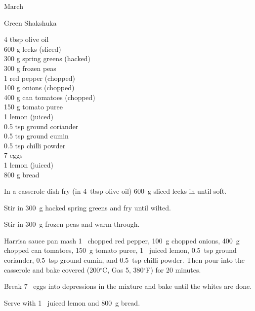 \begin{menu}{March}
    \begin{recipe}{2}{Green Shakshuka}%
		\begin{ingredients}
		4 tbsp olive oil  \\
	600 g leeks (sliced) \\
	300 g spring greens (hacked) \\
	300 g frozen peas  \\
	1  red pepper (chopped) \\
	100 g onions (chopped) \\
	400 g can tomatoes (chopped) \\
	150 g tomato puree  \\
	1  lemon (juiced) \\
	0.5 tsp ground coriander  \\
	0.5 tsp ground cumin  \\
	0.5 tsp chilli powder  \\
	7  eggs  \\
	1  lemon (juiced) \\
	800 g bread  \\
	
		\end{ingredients}
	
    \begin{instructions}
    \item 
        In a casserole dish fry
        (in 4~tbsp  olive oil)
        600~g sliced leeks
        in until soft.
      \item 
        Stir in 300~g hacked spring greens
        and fry until wilted.
      \item 
        Stir in 300~g  frozen peas
        and warm through.
      \item 
        Harrisa
        sauce pan
        mash
        1~ chopped red pepper,
        100~g chopped onions,
        400~g chopped can tomatoes,
        150~g  tomato puree,
        1~ juiced lemon,
        0.5~tsp  ground coriander,
        0.5~tsp  ground cumin,
        and 
        0.5~tsp  chilli powder.
        Then pour into the casserole
        and bake covered (200$^{\circ}$C, Gas 5, 380$^{\circ}$F) for 20 minutes.      
      \item 
        Break 7~  eggs into depressions in the mixture
        and bake until the whites are done. 
      \item 
        Serve with 
        1~ juiced lemon 
        and
        800~g  bread.
      
    \end{instructions}
    \end{recipe}%
  

\end{menu}
